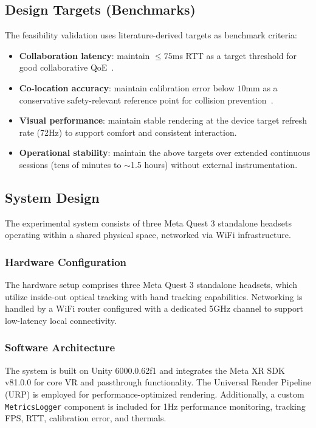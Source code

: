 \subsection{Design Targets (Benchmarks)}
The feasibility validation uses literature-derived targets as benchmark criteria:
\begin{itemize}
    \item \textbf{Collaboration latency}: maintain $\leq 75$ms RTT as a target threshold for good collaborative QoE~\cite{VanDammeSam2024Iolo}.
    \item \textbf{Co-location accuracy}: maintain calibration error below $10$mm as a conservative safety-relevant reference point for collision prevention~\cite{ReimerDennis2021CfSV}.
    \item \textbf{Visual performance}: maintain stable rendering at the device target refresh rate (72Hz) to support comfort and consistent interaction.
    \item \textbf{Operational stability}: maintain the above targets over extended continuous sessions (tens of minutes to $\sim$1.5 hours) without external instrumentation.
\end{itemize}

\subsection{System Design}

The experimental system consists of three Meta Quest 3 standalone headsets operating within a shared physical space, networked via WiFi infrastructure.

\subsubsection{Hardware Configuration}
The hardware setup comprises three Meta Quest 3 standalone headsets, which utilize inside-out optical tracking with hand tracking capabilities. Networking is handled by a WiFi router configured with a dedicated 5GHz channel to support low-latency local connectivity.

\subsubsection{Software Architecture}
The system is built on Unity 6000.0.62f1 and integrates the Meta XR SDK v81.0.0 for core VR and passthrough functionality. The Universal Render Pipeline (URP) is employed for performance-optimized rendering. Additionally, a custom \texttt{MetricsLogger} component is included for 1Hz performance monitoring, tracking FPS, RTT, calibration error, and thermals.



